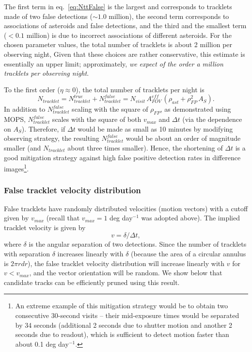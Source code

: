 The first term in eq.~\ref{eq:NttFalse} is the largest and corresponds to tracklets made of two false
detections ($\sim1.0$ million), the second term corresponds to associations of asteroids and false detections,
and the third and the smallest term ($<0.1$ million) is due to incorrect associations of different asteroids.
For the chosen parameter values, the total number of tracklets is about 2 million per observing night, Given that
these choices are rather conservative, this estimate is essentially an upper limit; approximately,
{\it we expect of the order a million tracklets per observing night}.

To the first order ($\eta \approx 0$), the total number of tracklets per night is
\begin{equation}
    N_{tracklet} =  N_{tracklet}^{true} + N_{tracklet}^{false} =
       N_{visit} \, A_{FOV}^{eff} \, \left(\rho_{ast}  + \rho^2_{FP}  \, A_S \right).
\end{equation}
In addition to $N_{tracklet}^{false}$ scaling with the square of $\rho_{FP}$, as demonstrated using MOPS,
$N_{tracklet}^{false}$ scales with the square of
both $v_{max}$ and  $\Delta t$ (via the dependence on $A_S$). Therefore, if $\Delta t$ would be made
as small as 10 minutes by modifying observing strategy, the resulting $N_{tracklet}^{false}$ would be about an
order of magnitude smaller (and $N_{tracklet}$ about three times smaller).  Hence, the shortening of $\Delta t$ is
a good mitigation strategy against high false positive detection rates in difference images\footnote{An
extreme example of this mitigation strategy would be to obtain two consecutive 30-second visits -- their
mid-exposure times would be separated by 34 seconds (additional 2 seconds due to shutter motion and another
2 seconds due to readout), which is sufficient to detect motion faster than about 0.1 deg day$^{-1}$.}.


\subsubsection{False tracklet velocity distribution \label{sec:falsev}}

False tracklets have randomly distributed velocities (motion vectors) with a cutoff given by $v_{max}$
(recall that $v_{max} = 1$ deg day$^{-1}$ was adopted above). The implied tracklet velocity is given by
\begin{equation}
                       v =  \delta / \Delta t,
\end{equation}
where $\delta$ is the angular separation of two detections. Since the number of tracklets
with separation $\delta$ increases linearly with $\delta$ (because the area of a circular
annulus is $2\pi r dr$), the false tracklet velocity distribution will increase linearly with
$v$ for $v<v_{max}$, and the vector orientation will be random. We show below that candidate
tracks can be efficiently pruned using this result.



